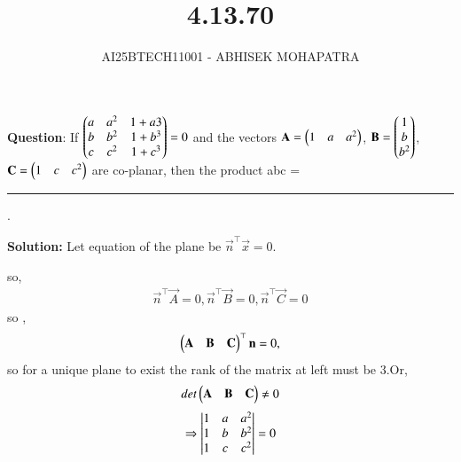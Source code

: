 \documentclass[journal,12pt,onecolumn]{IEEEtran}
\begin{document}
\title{4.13.70}
\author{AI25BTECH11001 - ABHISEK MOHAPATRA}
{\let\newpage\relax\maketitle}
	 	\textbf{Question}:
If $\begin{pmatrix}a &a^2 &1+ a3\\ b & b^2 & 1 + b^3\\c & c^2 & 1 + c^3\end{pmatrix} = 0$
and the vectors $\mathbf{A}=\begin{pmatrix}1&a&a^2\end{pmatrix}$, $\mathbf{B}=\begin{pmatrix}1\\b\\b^2\end{pmatrix}$, $\mathbf{C}=\begin{pmatrix}1&c&c^2\end{pmatrix}$ are co-planar, then the product
abc = \rule{1cm}{0.15mm}.
		

		\textbf{Solution:} 
Let equation of the plane be $\vec{n}^\top\vec{x}=0$.

so, 
\begin{align}
\vec{n}^\top\vec{A}=0,
\vec{n}^\top\vec{B}=0,
\vec{n}^\top\vec{C}=0
\end{align}
so ,
\begin{align}
		\begin{pmatrix}\mathbf{A}&\mathbf{B}&\mathbf{C}\end{pmatrix}^\top\mathbf{n}=0,
\end{align}
so for a unique plane to exist the rank of the matrix at left must be 3.Or, 
\begin{align}
		det\begin{pmatrix}\mathbf{A}&\mathbf{B}&\mathbf{C}\end{pmatrix} \neq 0
\end{align}
\begin{align}
		\Rightarrow\begin{vmatrix}1&a &a^2 \\1& b & b^2 \\1& c & c^2\end{vmatrix}	= 0
\end{align}
\end{document}
